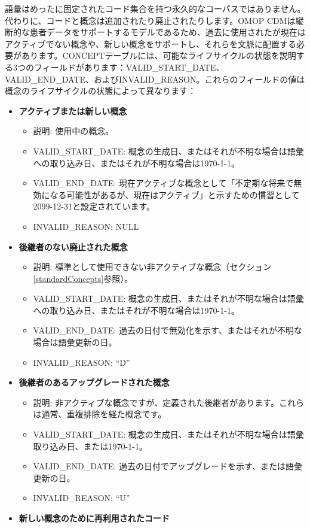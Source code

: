 \documentclass[
  11pt]{book}
\providecommand{\tightlist}{%
  \setlength{\itemsep}{0pt}\setlength{\parskip}{0pt}}
\theoremstyle{definition}
\theoremstyle{definition}
\theoremstyle{definition}
\theoremstyle{definition}
\theoremstyle{remark}
\begin{document}
語彙はめったに固定されたコード集合を持つ永久的なコーパスではありません。代わりに、コードと概念は追加されたり廃止されたりします。OMOP CDMは縦断的な患者データをサポートするモデルであるため、過去に使用されたが現在はアクティブでない概念や、新しい概念をサポートし、それらを文脈に配置する必要があります。CONCEPTテーブルには、可能なライフサイクルの状態を説明する3つのフィールドがあります：VALID\_START\_DATE、VALID\_END\_DATE、およびINVALID\_REASON。これらのフィールドの値は概念のライフサイクルの状態によって異なります：

\begin{itemize}
\tightlist
\item
  \textbf{アクティブまたは新しい概念}

  \begin{itemize}
  \tightlist
  \item
    説明: 使用中の概念。
  \item
    VALID\_START\_DATE: 概念の生成日、またはそれが不明な場合は語彙への取り込み日、またはそれが不明な場合は1970-1-1。
  \item
    VALID\_END\_DATE: 現在アクティブな概念として「不定期な将来で無効になる可能性があるが、現在はアクティブ」と示すための慣習として2099-12-31と設定されています。
  \item
    INVALID\_REASON: NULL
  \end{itemize}
\item
  \textbf{後継者のない廃止された概念}

  \begin{itemize}
  \tightlist
  \item
    説明: 標準として使用できない非アクティブな概念（セクション\ref{standardConcepts}参照）。
  \item
    VALID\_START\_DATE: 概念の生成日、またはそれが不明な場合は語彙への取り込み日、またはそれが不明な場合は1970-1-1。
  \item
    VALID\_END\_DATE: 過去の日付で無効化を示す、またはそれが不明な場合は語彙更新の日。
  \item
    INVALID\_REASON: ``D''
  \end{itemize}
\item
  \textbf{後継者のあるアップグレードされた概念}

  \begin{itemize}
  \tightlist
  \item
    説明: 非アクティブな概念ですが、定義された後継者があります。これらは通常、重複排除を経た概念です。
  \item
    VALID\_START\_DATE: 概念の生成日、またはそれが不明な場合は語彙取り込み日、または1970-1-1。
  \item
    VALID\_END\_DATE: 過去の日付でアップグレードを示す、または語彙更新の日。
  \item
    INVALID\_REASON: ``U''
  \end{itemize}
\item
  \textbf{新しい概念のために再利用されたコード}


\end{itemize}
\end{document}
